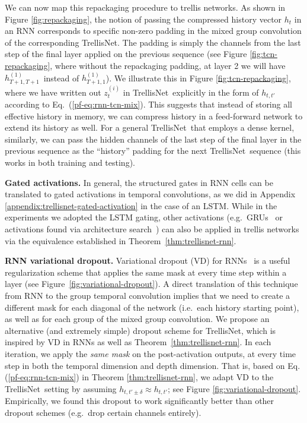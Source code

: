 \documentclass{article} \usepackage{iclr2019_conference,times}
\newcommand\mypara[1]{\vspace{0mm}\noindent\textbf{#1}}
\newcommand{\model}{TrellisNet}
\begin{document}
We can now map this repackaging procedure to trellis networks. As shown in Figure \ref{fig:repackaging}, the notion of passing the compressed history vector $h_t$ in an RNN corresponds to specific non-zero padding in the mixed group convolution of the corresponding TrellisNet.
The padding is simply the channels from the last step of the final layer applied on the previous sequence (see Figure \ref{fig:tcn-repackaging}, where without the repackaging padding, at layer 2 we will have \small$h_{T+1, T+1}^{(1)}$\normalsize~instead of \small$h_{T+1, 1}^{(1)}$\normalsize). We illustrate this in Figure \ref{fig:tcn-repackaging}, where we have written out $z_t^{(i)}$ in \model~explicitly in the form of $h_{t,t'}$ according to Eq.~(\ref{pf-eq:rnn-tcn-mix}). This suggests that instead of storing all effective history in memory, we can compress history in a feed-forward network to extend its history as well. For a general \model~that employs a dense kernel, similarly, we can pass the hidden channels of the last step of the final layer in the previous sequence as the ``history'' padding for the next \model~sequence (this works in both training and testing).


\mypara{Gated activations.} In general, the structured gates in RNN cells can be translated to gated activations in temporal convolutions, as we did in Appendix \ref{appendix:trellisnet-gated-activation} in the case of an LSTM. While in the experiments we adopted the LSTM gating, other activations (e.g.\ GRUs~\citep{choGRU} or activations found via architecture search~\citep{zoph2017neural}) can also be applied in trellis networks via the equivalence established in Theorem~\ref{thm:trellisnet-rnn}.


\mypara{RNN variational dropout.}
Variational dropout (VD) for RNNs~\citep{gal2016dropout} is a useful regularization scheme that applies the same mask at every time step within a layer (see Figure~\ref{fig:variational-dropout}). A direct translation of this technique from RNN to the group temporal convolution implies that we need to create a different mask for each diagonal of the network (i.e.\ each history starting point), as well as for each group of the mixed group convolution. We propose an alternative (and extremely simple) dropout scheme for TrellisNet, which is inspired by VD in RNNs as well as Theorem~\ref{thm:trellisnet-rnn}. In each iteration, we apply the \emph{same mask} on the post-activation outputs, at every time step in both the temporal dimension and depth dimension. That is, based on Eq. (\ref{pf-eq:rnn-tcn-mix}) in Theorem \ref{thm:trellisnet-rnn}, we adapt VD to the \model~setting by assuming $h_{t, t' \pm \delta} \approx h_{t,t'}$; see Figure \ref{fig:variational-dropout}. Empirically, we found this dropout to work significantly better than other dropout schemes (e.g.\ drop certain channels entirely).
\end{document}
